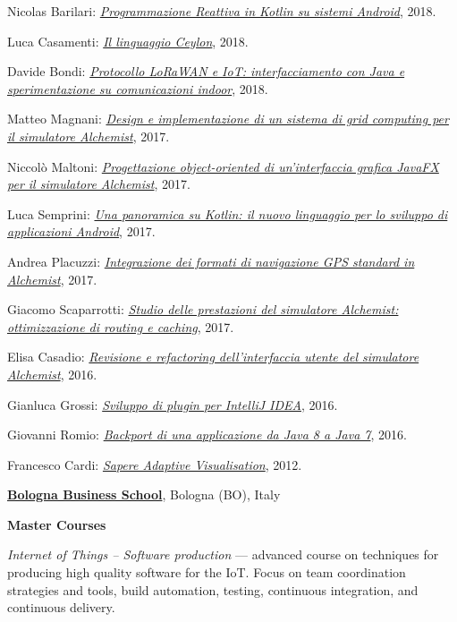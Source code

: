 \begin{outerlist}
\begin{innerlist}
      \item Nicolas Barilari: \href{http://amslaurea.unibo.it/16841/}{\textit{Programmazione Reattiva in Kotlin su sistemi Android}}, 2018.
      \item Luca Casamenti: \href{http://amslaurea.unibo.it/16788/}{\textit{Il linguaggio Ceylon}}, 2018.
      \item Davide Bondi: \href{http://amslaurea.unibo.it/15730/}{\textit{Protocollo LoRaWAN e IoT: interfacciamento con Java e sperimentazione su comunicazioni indoor}}, 2018.
      \item Matteo Magnani: \href{http://amslaurea.unibo.it/17133/}{\textit{Design e implementazione di un sistema di grid computing per il simulatore Alchemist}}, 2017.
      \item Niccolò Maltoni: \href{http://amslaurea.unibo.it/14682/}{\textit{Progettazione object-oriented di un'interfaccia grafica JavaFX per il simulatore Alchemist}}, 2017.
      \item Luca Semprini: \href{http://amslaurea.unibo.it/14673/}{\textit{Una panoramica su Kotlin: il nuovo linguaggio per lo sviluppo di applicazioni Android}}, 2017.
      \item Andrea Placuzzi: \href{http://amslaurea.unibo.it/14329/}{\textit{Integrazione dei formati di navigazione GPS standard in Alchemist}}, 2017.
      \item Giacomo Scaparrotti: \href{http://amslaurea.unibo.it/14019/}{\textit{Studio delle prestazioni del simulatore Alchemist: ottimizzazione di routing e caching}}, 2017.
      \item Elisa Casadio: \href{http://amslaurea.unibo.it/12310/}{\textit{Revisione e refactoring dell'interfaccia utente del simulatore Alchemist}}, 2016.
      \item Gianluca Grossi: \href{http://amslaurea.unibo.it/12503/}{\textit{Sviluppo di plugin per IntelliJ IDEA}}, 2016.
      \item Giovanni Romio: \href{http://amslaurea.unibo.it/10481/}{\textit{Backport di una applicazione da Java 8 a Java 7}}, 2016.
      \item Francesco Cardi: \href{http://archive.fo/zMGo8}{\textit{Sapere Adaptive Visualisation}}, 2012.
    \end{innerlist}
\end{outerlist}
\halfblankline

\href{https://www.bbs.unibo.eu/hp/}{\textbf{Bologna Business School}}, Bologna (BO), Italy
\begin{outerlist}
\item[] \textbf{Master Courses} %
    \begin{innerlist}
        \item \textit{Internet of Things -- Software production} --- advanced course on techniques for producing high quality software for the IoT. Focus on team coordination strategies and tools, build automation, testing, continuous integration, and continuous delivery.
\end{innerlist}
\halfblankline
\end{outerlist}

